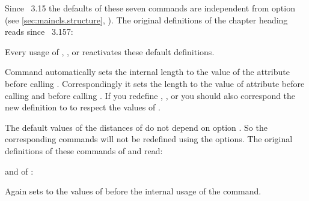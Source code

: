 Since \KOMAScript~3.15 the defaults of these seven commands
are independent from option  (see
\autoref{sec:maincls.structure},
). The original definitions of the
chapter heading reads since
\KOMAScript~3.157:
\begin{lstcode}
  \newcommand*{\chapterheadstartvskip}{\vspace{\@tempskipa}}
  \newcommand*{\chapterheadmidvskip}{\par\nobreak\vskip\@tempskipa}
  \newcommand*{\chapterheadendvskip}{\vskip\@tempskipa}
\end{lstcode}
Every usage of ,
, or  reactivates
these default definitions.

Command  automatically sets the internal length
 to the value of the
 attribute
 before calling
. Correspondingly it sets the length to the value
of attribute  before calling  and
 before calling . If you redefine
, , or
 you should also correspond the new definition to
 to respect the values of .

The default values of the distances of  do not depend on option
. So the corresponding commands will not be redefined using
the options. The original definitions of these commands of 
and  read:
\begin{lstcode}
  \newcommand*{\partheadstartvskip}{%
    \null\vskip-\baselineskip\vskip\@tempskipa
  }
  \newcommand*{\partheadmidvskip}{%
    \par\nobreak
    \vskip\@tempskipa
  }
  \newcommand*{\partheadendvskip}{%
    \vskip\@tempskipa\newpage
  }
\end{lstcode}
and of :
\begin{lstcode}
  \newcommand*{\partheadstartvskip}{%
    \addvspace{\@tempskipa}%
  }
  \newcommand*{\partheadmidvskip}{%
    \par\nobreak
  }
  \newcommand*{\partheadendvskip}{%
    \vskip\@tempskipa
  }
\end{lstcode}
Again  sets  to the
values of  before
the internal usage of the command.

